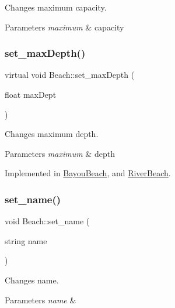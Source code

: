 Changes maximum capacity. 


\begin{DoxyParams}{Parameters}
{\em maximum} & capacity \\
\hline
\end{DoxyParams}
\mbox{\label{class_beach_af0226438bc6e731b2bca9f5a6078b572}} 
\subsubsection{\texorpdfstring{set\+\_\+max\+Depth()}{set\_maxDepth()}}
{\footnotesize\ttfamily virtual void Beach\+::set\+\_\+max\+Depth (\begin{DoxyParamCaption}\item[{float}]{max\+Dept }\end{DoxyParamCaption})\hspace{0.3cm}{\ttfamily [pure virtual]}}



Changes maximum depth. 


\begin{DoxyParams}{Parameters}
{\em maximum} & depth \\
\hline
\end{DoxyParams}


Implemented in \hyperlink{class_bayou_beach_ada06dbcef6b191fc0413eca4bc5f7b65}{Bayou\+Beach}, and \hyperlink{class_river_beach_a1118c334abeeae8352ecaf0f33059f6a}{River\+Beach}.

\mbox{\label{class_beach_acfca41723a51e0da9596facfafe8f6db}} 
\subsubsection{\texorpdfstring{set\+\_\+name()}{set\_name()}}
{\footnotesize\ttfamily void Beach\+::set\+\_\+name (\begin{DoxyParamCaption}\item[{string}]{name }\end{DoxyParamCaption})}



Changes name. 


\begin{DoxyParams}{Parameters}
{\em name} & \\
\hline
\end{DoxyParams}
\mbox{\label{class_beach_a3f3a4bde9008bcc87861710e8c99c008}} 
